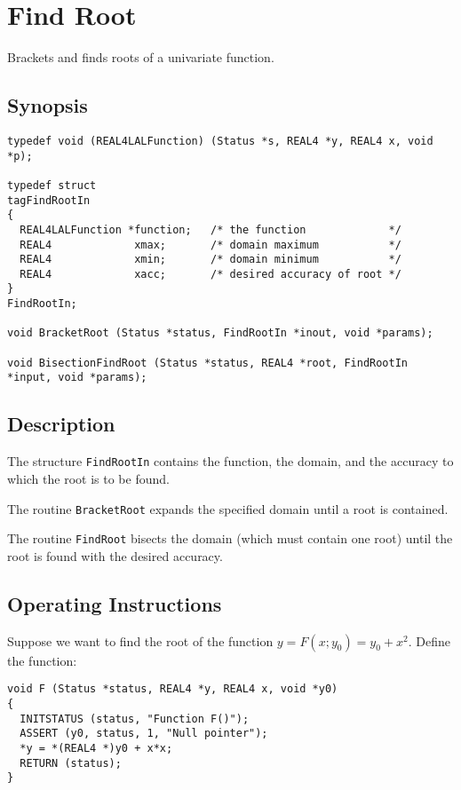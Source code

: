 \documentclass{article}
\begin{document}
\section{Find Root}

Brackets and finds roots of a univariate function.

\subsection{Synopsis}
\begin{verbatim}
typedef void (REAL4LALFunction) (Status *s, REAL4 *y, REAL4 x, void *p);

typedef struct
tagFindRootIn
{
  REAL4LALFunction *function;   /* the function             */
  REAL4             xmax;       /* domain maximum           */
  REAL4             xmin;       /* domain minimum           */
  REAL4             xacc;       /* desired accuracy of root */
}
FindRootIn;

void BracketRoot (Status *status, FindRootIn *inout, void *params);

void BisectionFindRoot (Status *status, REAL4 *root, FindRootIn *input, void *params);
\end{verbatim}

\subsection{Description}

The structure \verb+FindRootIn+ contains the function, the domain, and the
accuracy to which the root is to be found.

The routine \verb+BracketRoot+ expands the specified domain until a root is
contained.

The routine \verb+FindRoot+ bisects the domain (which must contain one root)
until the root is found with the desired accuracy.

\subsection{Operating Instructions}

Suppose we want to find the root of the function $y = F(x;y_0) = y_0 + x^2$.
Define the function:
\begin{verbatim}
void F (Status *status, REAL4 *y, REAL4 x, void *y0)
{
  INITSTATUS (status, "Function F()");
  ASSERT (y0, status, 1, "Null pointer");
  *y = *(REAL4 *)y0 + x*x;
  RETURN (status);
}
\end{verbatim}
\end{document}

